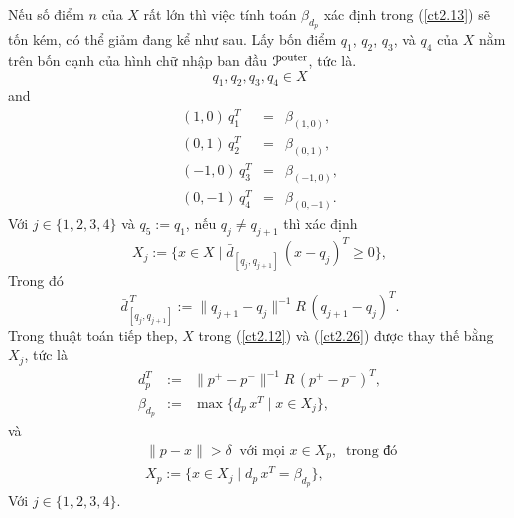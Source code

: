 \documentclass[12pt,a4paper,openany,oneside]{report}
\begin{document}
Nếu số điểm $n$ của $X$ rất lớn thì việc tính toán $\beta_{d_{p}}$ xác định trong (\ref{ct2.13}) sẽ tốn kém, có thể giảm đang kể như sau. Lấy bốn điểm  $q_1$, $q_2$, $q_3$, và $q_4$ của $X$ nằm trên bốn cạnh của hình chữ nhập ban đầu ${\cal P}^{\rm outer}$, tức là.
\begin{equation}\label{ct2.30}
	q_1, q_2, q_3, q_4 \in X
\end{equation}
and
\begin{equation}\label{ct2.31}
	\begin{array}{lcl}
		(1, 0)\, q_1^T &=& \beta_{(1, 0)}, \\
		(0, 1)\, q_2^T &=& \beta_{(0, 1)}, \\
		(-1, 0)\, q_3^T &=& \beta_{(-1, 0)}, \\
		(0, -1)\, q_4^T &=& \beta_{(0, -1)}.
	\end{array}
\end{equation}
Với $j \in \{1, 2, 3, 4\}$ và $q_5 := q_1$, nếu $q_j \not= q_{j+1}$ thì xác định
\begin{equation}\label{ct2.32}
	X_j := \{x \in X \mid \bar d_{[q_j, q_{j+1}]}\, (x - q_j)^T \geq 0\}, 
\end{equation}
Trong đó
\begin{equation}\label{ct2.33}
	\bar d_{[q_j, q_{j+1}]}^{\, T} := \|q_{j+1} - q_j\|^{-1} R\, (q_{j+1} - q_j)^T.
\end{equation}
Trong thuật toán tiếp thep, $X$ trong (\ref{ct2.12}) và (\ref{ct2.26}) được thay thế bằng $X_j$, tức là
\begin{equation}\label{ct2.34}
	\begin{array}{lcl}
		d_{p}^T &:=& \|p^+ - p^-\|^{-1} R \, (p^+ - p^-)^T, \\
		\beta_{d_{p}} &:=& \max\{d_{p}\, x^T \mid x \in X_j\}, 
	\end{array}
\end{equation}
và
\begin{equation}\label{ct2.35}
	\begin{array}{lcl}
		&& \|p - x\| > \delta \ \mbox{ với mọi } x \in X_p, \ \mbox{ trong đó} \\
		&& X_p := \{x \in X_j \mid d_{p}\, x^T = \beta_{d_{p}}\},
	\end{array}
\end{equation}
Với $j \in \{1, 2, 3, 4\}$.
\end{document}
